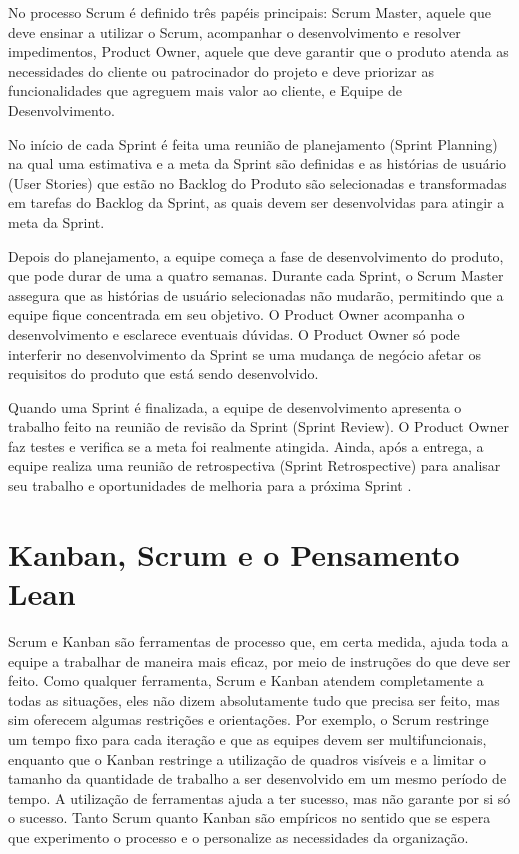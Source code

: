 No processo Scrum é definido três papéis principais: Scrum Master, aquele que deve ensinar a utilizar o Scrum, acompanhar o desenvolvimento e resolver impedimentos, Product Owner, aquele que deve garantir que o produto atenda as necessidades do cliente ou patrocinador do projeto e deve priorizar as funcionalidades que agreguem mais valor ao cliente, e Equipe de Desenvolvimento. 

No início de cada Sprint é feita uma reunião de planejamento (Sprint Planning) na qual uma estimativa e a meta da Sprint são definidas e as histórias de usuário (User Stories) que estão no Backlog do Produto são selecionadas e transformadas em tarefas do Backlog da Sprint, as quais devem ser desenvolvidas para atingir a meta da Sprint. 

Depois do planejamento, a equipe começa a fase de desenvolvimento do produto, que pode durar de uma a quatro semanas. Durante cada Sprint, o Scrum Master assegura que as histórias de usuário selecionadas não mudarão, permitindo que a equipe fique concentrada em seu objetivo. O Product Owner acompanha o desenvolvimento e esclarece eventuais dúvidas. O Product Owner só pode interferir no desenvolvimento da Sprint se uma mudança de negócio afetar os requisitos do produto que está sendo desenvolvido.

Quando uma Sprint é finalizada, a equipe de desenvolvimento apresenta o trabalho feito na reunião de revisão da Sprint (Sprint Review). O Product Owner faz testes e verifica se a meta foi realmente atingida. Ainda, após a entrega, a equipe realiza uma reunião de retrospectiva (Sprint Retrospective) para analisar seu trabalho e oportunidades de melhoria para a próxima Sprint   \cite{jeff}. 

\section[Kanban, Scrum e o Pensamento Lean ]{Kanban, Scrum e o Pensamento Lean }

Scrum e Kanban são ferramentas de processo que, em certa medida, ajuda toda a equipe a trabalhar de maneira mais eficaz, por meio de instruções do que deve ser feito. Como qualquer ferramenta, Scrum e Kanban atendem completamente a todas as situações, eles não dizem absolutamente tudo que precisa ser feito, mas sim oferecem algumas restrições e orientações. Por exemplo, o Scrum restringe um tempo fixo para cada iteração e que as equipes devem ser multifuncionais, enquanto que o Kanban restringe a utilização de quadros visíveis e a limitar o tamanho da quantidade de trabalho a ser desenvolvido em um mesmo período de tempo. A utilização de ferramentas ajuda a ter sucesso, mas não garante por si só o sucesso. Tanto Scrum quanto Kanban são empíricos no sentido que se espera que experimento o processo e o personalize as necessidades da organização.

